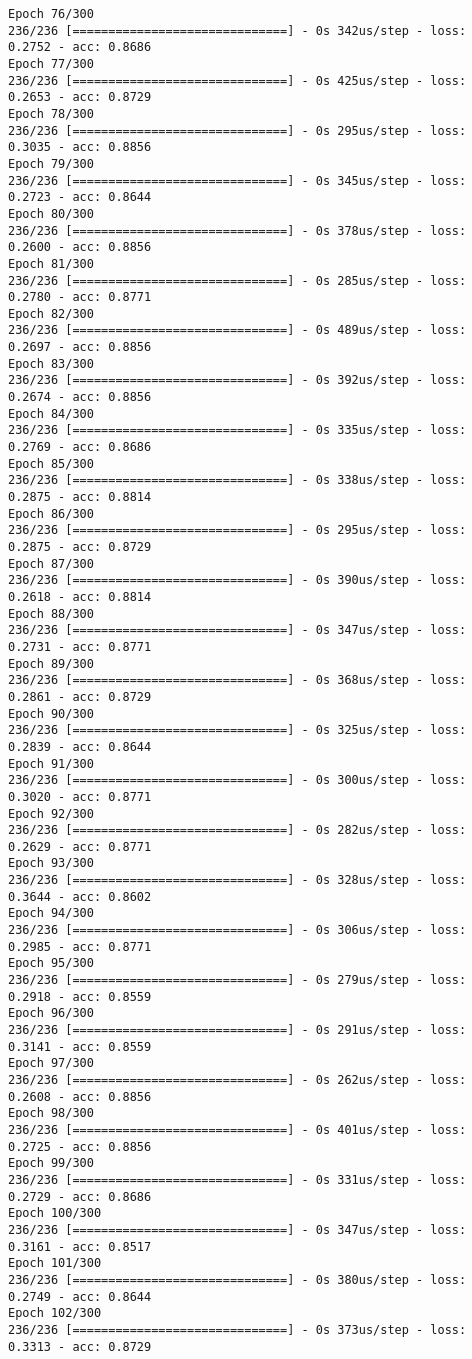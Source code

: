 \documentclass[11pt]{article}
\begin{document}
\begin{Verbatim}[commandchars=\\\{\}]
Epoch 76/300
236/236 [==============================] - 0s 342us/step - loss: 0.2752 - acc: 0.8686
Epoch 77/300
236/236 [==============================] - 0s 425us/step - loss: 0.2653 - acc: 0.8729
Epoch 78/300
236/236 [==============================] - 0s 295us/step - loss: 0.3035 - acc: 0.8856
Epoch 79/300
236/236 [==============================] - 0s 345us/step - loss: 0.2723 - acc: 0.8644
Epoch 80/300
236/236 [==============================] - 0s 378us/step - loss: 0.2600 - acc: 0.8856
Epoch 81/300
236/236 [==============================] - 0s 285us/step - loss: 0.2780 - acc: 0.8771
Epoch 82/300
236/236 [==============================] - 0s 489us/step - loss: 0.2697 - acc: 0.8856
Epoch 83/300
236/236 [==============================] - 0s 392us/step - loss: 0.2674 - acc: 0.8856
Epoch 84/300
236/236 [==============================] - 0s 335us/step - loss: 0.2769 - acc: 0.8686
Epoch 85/300
236/236 [==============================] - 0s 338us/step - loss: 0.2875 - acc: 0.8814
Epoch 86/300
236/236 [==============================] - 0s 295us/step - loss: 0.2875 - acc: 0.8729
Epoch 87/300
236/236 [==============================] - 0s 390us/step - loss: 0.2618 - acc: 0.8814
Epoch 88/300
236/236 [==============================] - 0s 347us/step - loss: 0.2731 - acc: 0.8771
Epoch 89/300
236/236 [==============================] - 0s 368us/step - loss: 0.2861 - acc: 0.8729
Epoch 90/300
236/236 [==============================] - 0s 325us/step - loss: 0.2839 - acc: 0.8644
Epoch 91/300
236/236 [==============================] - 0s 300us/step - loss: 0.3020 - acc: 0.8771
Epoch 92/300
236/236 [==============================] - 0s 282us/step - loss: 0.2629 - acc: 0.8771
Epoch 93/300
236/236 [==============================] - 0s 328us/step - loss: 0.3644 - acc: 0.8602
Epoch 94/300
236/236 [==============================] - 0s 306us/step - loss: 0.2985 - acc: 0.8771
Epoch 95/300
236/236 [==============================] - 0s 279us/step - loss: 0.2918 - acc: 0.8559
Epoch 96/300
236/236 [==============================] - 0s 291us/step - loss: 0.3141 - acc: 0.8559
Epoch 97/300
236/236 [==============================] - 0s 262us/step - loss: 0.2608 - acc: 0.8856
Epoch 98/300
236/236 [==============================] - 0s 401us/step - loss: 0.2725 - acc: 0.8856
Epoch 99/300
236/236 [==============================] - 0s 331us/step - loss: 0.2729 - acc: 0.8686
Epoch 100/300
236/236 [==============================] - 0s 347us/step - loss: 0.3161 - acc: 0.8517
Epoch 101/300
236/236 [==============================] - 0s 380us/step - loss: 0.2749 - acc: 0.8644
Epoch 102/300
236/236 [==============================] - 0s 373us/step - loss: 0.3313 - acc: 0.8729

\end{Verbatim}
\end{document}

